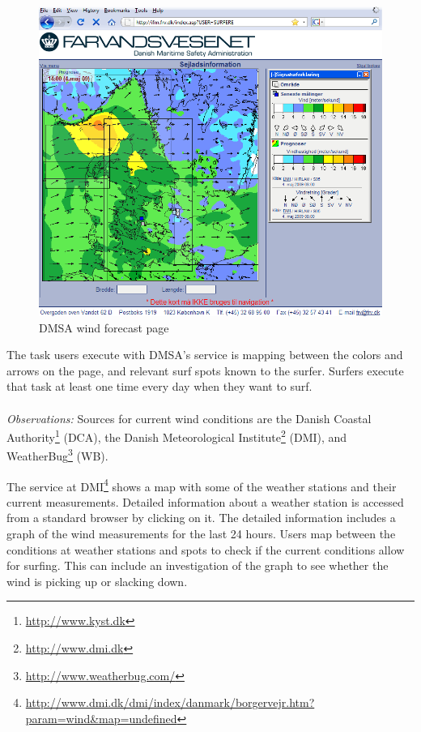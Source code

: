 \begin{figure}[htbp]
  \centering
  \includegraphics[width=\textwidth]{./Figures/frv}
  \caption{DMSA wind forecast page}
  \label{fig:frv}
\end{figure}

The task users execute with DMSA's service is mapping between the colors and
arrows on the page, and relevant surf spots known to the surfer. Surfers execute
that task at least one time every day when they want to surf.  \\\\
\textit{Observations:} Sources for current wind conditions are the Danish Coastal
Authority\footnote{\url{http://www.kyst.dk}} (DCA), the Danish Meteorological
Institute\footnote{\url{http://www.dmi.dk}} (DMI), and
WeatherBug\footnote{\url{http://www.weatherbug.com/}} (WB).

The service at
DMI\footnote{\url{http://www.dmi.dk/dmi/index/danmark/borgervejr.htm?param=wind&map=undefined}}
shows a map with some of the weather stations and their current
measurements. Detailed information about a weather station is accessed from a
standard browser by clicking on it. The detailed information includes a graph of
the wind measurements for the last 24 hours. Users map between the conditions at
weather stations and spots to check if the current conditions allow for
surfing. This can include an investigation of the graph to see whether the wind
is picking up or slacking down.

